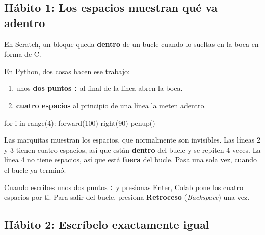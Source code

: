 \subsection*{Hábito 1: Los espacios muestran qué va adentro}

En Scratch, un bloque queda \textbf{dentro} de un bucle cuando lo sueltas en la boca en forma de C.

En Python, dos cosas hacen ese trabajo:
\begin{enumerate}
  \item unos \textbf{dos puntos} \texttt{:} al final de la línea abren la boca.
  \item \textbf{cuatro espacios} al principio de una línea la meten adentro.
\end{enumerate}

\begin{tcbraster}[raster columns=2, raster equal height=rows, raster column skip=12pt, raster valign=center]
\begin{tcolorbox}[colback=white, colframe=white, boxrule=0pt, valign=center]
\begin{scratch}
\end{scratch}
\end{tcolorbox}
\begin{spaces}
for i in range(4):
    forward(100)
    right(90)
penup()
\end{spaces}
\end{tcbraster}

Las marquitas \texttt{\textvisiblespace} muestran los espacios, que normalmente son invisibles. Las líneas 2 y 3 tienen cuatro espacios, así que están \textbf{dentro} del bucle y se repiten 4 veces. La línea 4 no tiene espacios, así que está \textbf{fuera} del bucle. Pasa una sola vez, cuando el bucle ya terminó.

\begin{think}
Cuando escribes unos dos puntos \texttt{:} y presionas Enter, Colab pone los cuatro espacios por ti. Para salir del bucle, presiona \textbf{Retroceso} (\textit{Backspace}) una vez.
\end{think}

\subsection*{Hábito 2: Escríbelo exactamente igual}

